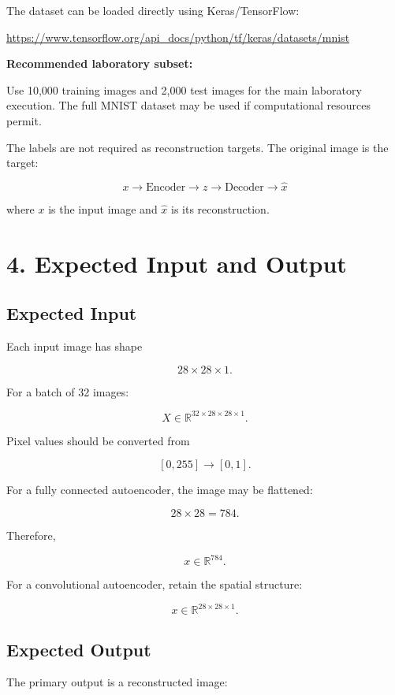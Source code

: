 \documentclass[10pt]{article}
\begin{document}
The dataset can be loaded directly using Keras/TensorFlow:

\url{https://www.tensorflow.org/api_docs/python/tf/keras/datasets/mnist}

\textbf{Recommended laboratory subset:}

Use 10,000 training images and 2,000 test images for the main laboratory
execution. The full MNIST dataset may be used if computational resources
permit.

The labels are not required as reconstruction targets. The original image is
the target:

\[
\boxed{x\rightarrow \text{Encoder}\rightarrow z
\rightarrow\text{Decoder}\rightarrow\hat{x}}
\]

where $x$ is the input image and $\hat{x}$ is its reconstruction.

\section*{4. Expected Input and Output}

\subsection*{Expected Input}

Each input image has shape

\[
28\times28\times1.
\]

For a batch of 32 images:

\[
X\in\mathbb{R}^{32\times28\times28\times1}.
\]

Pixel values should be converted from

\[
[0,255]\rightarrow[0,1].
\]

For a fully connected autoencoder, the image may be flattened:

\[
28\times28=784.
\]

Therefore,

\[
x\in\mathbb{R}^{784}.
\]

For a convolutional autoencoder, retain the spatial structure:

\[
x\in\mathbb{R}^{28\times28\times1}.
\]

\subsection*{Expected Output}

The primary output is a reconstructed image:
\end{document}
